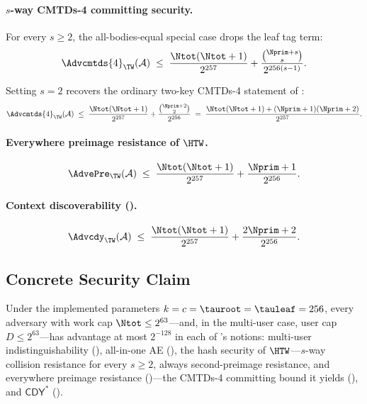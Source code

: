\paragraph{$s$-way CMTDs-4 committing security.}
For every $s \geq 2$, the all-bodies-equal special case drops the leaf
tag term:
\[
  \Advcmtds{4}_\TW(\mathcal{A})
  \;\leq\;
  \frac{\Ntot(\Ntot + 1)}{2^{257}}
  + \frac{\binom{\Nprim + s}{s}}{2^{256 (s - 1)}}.
\]

\begin{remark}
\label{rem:cmtd4-s2}
Setting $s = 2$ recovers the ordinary two-key
CMTDs-4 statement of \cite{BH22}:
\[
  \Advcmtds{4}_\TW(\mathcal{A})
  \;\leq\;
  \frac{\Ntot(\Ntot + 1)}{2^{257}}
  + \frac{\binom{\Nprim + 2}{2}}{2^{256}}
  \;=\;
  \frac{\Ntot(\Ntot + 1) + (\Nprim + 1)(\Nprim + 2)}{2^{257}}.
\]
\end{remark}

\paragraph{Everywhere preimage resistance of $\HTW$.}
\[
  \AdvePre_\TW(\mathcal{A})
  \;\leq\;
  \frac{\Ntot(\Ntot + 1)}{2^{257}}
  + \frac{\Nprim + 1}{2^{256}}.
\]

\paragraph{Context discoverability \textnormal{(\cite{MLGR23})}.}
\[
  \Advcdy_\TW(\mathcal{A})
  \;\leq\;
  \frac{\Ntot(\Ntot + 1)}{2^{257}}
  + \frac{2\Nprim + 2}{2^{256}}.
\]

\subsection{Concrete Security Claim}
\label{sec:concrete-claim}

\begin{corollary}
\label{cor:concrete-security}
Under the implemented parameters $k = c = \tauroot = \tauleaf = 256$, every
adversary with work cap $\Ntot \leq 2^{63}$---and, in the multi-user case,
user cap $D \leq 2^{63}$---has advantage at most $2^{-128}$ in each of
\TW{}'s notions: multi-user indistinguishability (),
all-in-one AE (), the \cite{RS04} hash security of
$\HTW$---$s$-way collision resistance for every $s \geq 2$, always second-preimage
resistance, and everywhere preimage resistance
()---the \cite{BH22}
CMTDs-4 committing bound it yields (), and \cite{MLGR23}
$\mathsf{CDY}^\ast$ ().
\end{corollary}

